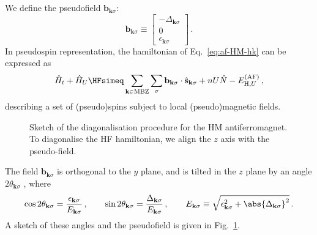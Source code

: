 %
%

We define the pseudofield $\mathbf{b}_{\mathbf{k}\sigma}$:
\[
\mathbf{b}_{\mathbf{k}\sigma} \equiv \begin{bmatrix}
	-\Delta_{\mathbf{k}\sigma} \\ 0 \\ \epsilon_{\mathbf{k}\sigma} 
\end{bmatrix} \, .
\]
In pseudospin representation, the hamiltonian of Eq.~\eqref{eq:af-HM-hk} can be expressed as
\begin{equation}\label{eq:af-hm-spin-h}
	\hat H_t + \hat H_U \HFsimeq \sum_{\mathbf{k} \in \mathrm{MBZ}} \sum_\sigma \mathbf{b}_{\mathbf{k}\sigma} \cdot \hat{\mathbf{s}}_{\mathbf{k}\sigma} + nU \hat N - E_{\mathrm{H},U}^{(\mathrm{AF})} \, ,
\end{equation}
describing a set of (pseudo)spins subject to local (pseudo)magnetic fields. 
%
\begin{figure}
	\centering
	
	\caption{Sketch of the diagonalisation procedure for the HM antiferromagnet. To diagonalise the HF hamiltonian, we align the $z$ axis with the pseudo-field.}
	\label{fig:pseudo-magnetic-field-hm}
\end{figure}
%
The field $\mathbf{b}_{\mathbf{k}\sigma}$ is orthogonal to the $y$ plane, and is tilted in the $z$ plane by an angle $2\theta_{\mathbf{k}\sigma}$ , where
\[
\cos 2\theta_{\mathbf{k}\sigma} = \frac{\epsilon_{\mathbf{k}\sigma}}{E_{\mathbf{k}\sigma}} \, ,
\qquad
\sin 2\theta_{\mathbf{k}\sigma} = \frac{\Delta_{\mathbf{k}\sigma}}{E_{\mathbf{k}\sigma}} \, ,
\qquad
E_{\mathbf{k}\sigma} \equiv 	\sqrt{\epsilon_{\mathbf{k}\sigma}^2 + \abs{\Delta_{\mathbf{k}\sigma}}^2} \, .
\]
A sketch of these angles and the pseudofield is given in Fig.~\ref{fig:pseudo-magnetic-field-hm}.

